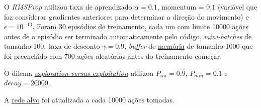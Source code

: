 O \textit{RMSProp} utilizou taxa de aprendizado $\alpha = 0.1$, momentum = $0.1$ (variável que faz considerar gradientes anteriores para determinar a direção do movimento) e $\epsilon = 10^{-10}$.
Foram 30 episódios de treinamento, cada um com limite 10000 ações antes de o episódio ser terminado automaticamente pelo código, \textit{mini-batches} de tamanho 100, taxa de desconto $\gamma = 0.9$, \textit{buffer} de \hyperref[sec:er]{memória} de tamanho 1000 que foi preenchido com 700 ações aleatórias antes do treinamento começar.

O dilema \hyperref[eq:exp_exp_prob]{\textit{exploration versus exploitation}} utilizou $P_{ini} = 0.9$, $P_{min} = 0.1$ e $decay = 20000$.

A \hyperref[sec:ft]{rede alvo} foi atualizada a cada 10000 ações tomadas.

%
%
%
%


